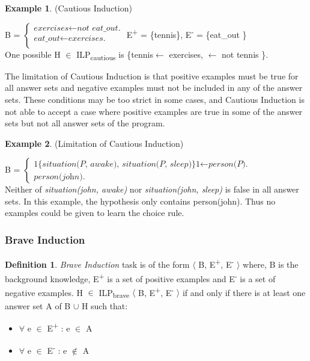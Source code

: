 \documentclass[11pt,twoside]{report}
\theoremstyle{plain}
\theoremstyle{definition}
\newtheorem{defn}[thm]{Definition} %
\newtheorem{examp}{Example}[section]
\begin{document}
\begin{examp} \normalfont (Cautious Induction) \\
\label{cautious_induction_example}

B = $\begin{cases}
	\textit{exercises}  \leftarrow \textit{not \ eat\_out.} \\
	\textit{eat\_out} \leftarrow \textit{exercises.} \\
      \end{cases}$
E\textsuperscript{+} = \{tennis\},      E\textsuperscript{-} = \{eat\_out \} \\

One possible  H $\in$ ILP\textsubscript{cautious} is \{tennis$ \leftarrow$ exercises, $\leftarrow$ not tennis \}.
\end{examp}

The limitation of Cautious Induction is that positive examples must be true for all answer sets and negative examples must not be included in any of the answer sets. These conditions may be too strict in some cases, and Cautious Induction is not able to accept a case where positive examples are true in some of the answer sets but not all answer sets of the program.

\begin{examp} \normalfont (Limitation of Cautious Induction) \\
\label{limitation_cautious}

B = $\begin{cases}
	\textit{1\{situation(P, awake), situation(P, sleep)\}1} \leftarrow \textit{person(P).} \\
	\textit{person(john).}
      \end{cases}$ \\

Neither of \textit{situation(john, awake)} nor \textit{situation(john, sleep)} is false in all answer sets. 
In this example, the hypothesis only contains person(john). Thus no examples could be given to learn the choice rule.
\end{examp}

\subsubsection{Brave Induction}
\begin{defn} \label{def:brave_induction}
\textit{Brave Induction} task is of the form $\langle$ B, E\textsuperscript{+}, E\textsuperscript{-} $\rangle$ where, B is the background knowledge, E\textsuperscript{+} is a set of positive examples and E\textsuperscript{-} is a set of negative examples.
 H $\in$ ILP\textsubscript{brave} $\langle$ B, E\textsuperscript{+}, E\textsuperscript{-} $\rangle$ if and only if there is at least one answer set A of B $\cup$ H such that:
\begin{itemize}
\item $\forall$ e $\in$ E\textsuperscript{+} : e $\in$ A
\item $\forall$ e $\in$ E\textsuperscript{-} : e $\notin$ A
\end{itemize}
\end{defn}
\end{document}
